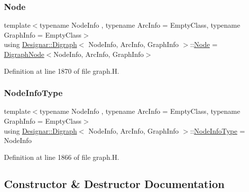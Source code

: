 \subsubsection{\texorpdfstring{Node}{Node}}
{\footnotesize\ttfamily template$<$typename Node\+Info , typename Arc\+Info  = Empty\+Class, typename Graph\+Info  = Empty\+Class$>$ \\
using \hyperlink{class_designar_1_1_digraph}{Designar\+::\+Digraph}$<$ Node\+Info, Arc\+Info, Graph\+Info $>$\+::\hyperlink{class_designar_1_1_digraph_a4dc921c41a480b7946a04170e997d8ae}{Node} =  \hyperlink{class_designar_1_1_digraph_node}{Digraph\+Node}$<$Node\+Info, Arc\+Info, Graph\+Info$>$}



Definition at line 1870 of file graph.\+H.

\mbox{\label{class_designar_1_1_digraph_a6438608ff27cb6f017705e18bd7fc478}} 
\subsubsection{\texorpdfstring{Node\+Info\+Type}{NodeInfoType}}
{\footnotesize\ttfamily template$<$typename Node\+Info , typename Arc\+Info  = Empty\+Class, typename Graph\+Info  = Empty\+Class$>$ \\
using \hyperlink{class_designar_1_1_digraph}{Designar\+::\+Digraph}$<$ Node\+Info, Arc\+Info, Graph\+Info $>$\+::\hyperlink{class_designar_1_1_digraph_a6438608ff27cb6f017705e18bd7fc478}{Node\+Info\+Type} =  Node\+Info}



Definition at line 1866 of file graph.\+H.



\subsection{Constructor \& Destructor Documentation}
\mbox{\label{class_designar_1_1_digraph_ae57ac8513bfcb29602cc08a3d4bc7485}} 
